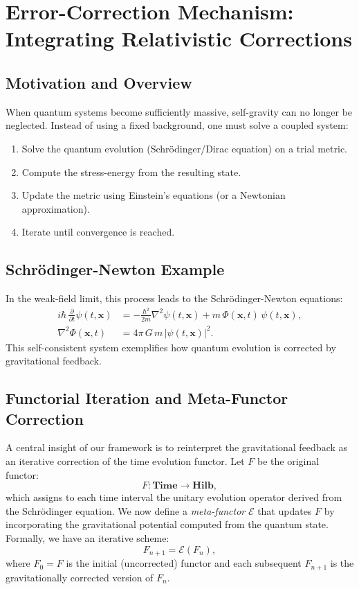 \documentclass[12pt]{article}
\begin{document}
\section{Error-Correction Mechanism: Integrating Relativistic Corrections}
\subsection{Motivation and Overview}
When quantum systems become sufficiently massive, self-gravity can no longer be neglected. Instead of using a fixed background, one must solve a coupled system:
\begin{enumerate}
    \item Solve the quantum evolution (Schrödinger/Dirac equation) on a trial metric.
    \item Compute the stress-energy from the resulting state.
    \item Update the metric using Einstein's equations (or a Newtonian approximation).
    \item Iterate until convergence is reached.
\end{enumerate}

\subsection{Schrödinger-Newton Example}
In the weak-field limit, this process leads to the Schrödinger-Newton equations:
\begin{align}
i\hbar\,\frac{\partial}{\partial t}\psi(t,\mathbf{x}) &= -\frac{\hbar^2}{2m}\nabla^2\psi(t,\mathbf{x})+m\,\Phi(\mathbf{x},t)\,\psi(t,\mathbf{x}),\\[1mm]
\nabla^2\Phi(\mathbf{x},t) &= 4\pi\,G\,m\,|\psi(t,\mathbf{x})|^2.
\end{align}
This self-consistent system exemplifies how quantum evolution is corrected by gravitational feedback.

\subsection{Functorial Iteration and Meta-Functor Correction}
A central insight of our framework is to reinterpret the gravitational feedback as an iterative correction of the time evolution functor. Let \(F\) be the original functor:
\[
F: \mathbf{Time} \to \mathbf{Hilb},
\]
which assigns to each time interval the unitary evolution operator derived from the Schrödinger equation. We now define a \emph{meta-functor} \(\mathcal{E}\) that updates \(F\) by incorporating the gravitational potential computed from the quantum state. Formally, we have an iterative scheme:
\[
F_{n+1} = \mathcal{E}(F_n),
\]
where \(F_0 = F\) is the initial (uncorrected) functor and each subsequent \(F_{n+1}\) is the gravitationally corrected version of \(F_n\).
\end{document}
